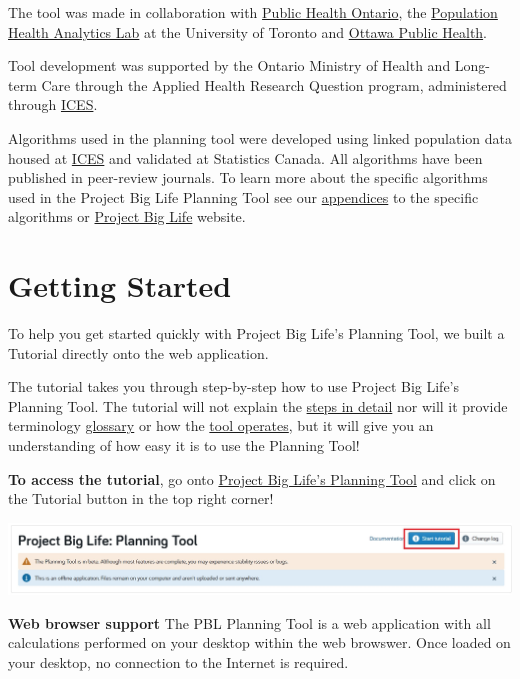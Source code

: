 \documentclass[]{book}
\begin{document}
The tool was made in collaboration with
\href{https://www.publichealthontario.ca/}{Public Health Ontario}, the
\href{https://pophealthanalytics.com/}{Population Health Analytics Lab}
at the University of Toronto and
\href{http://www.ottawapublichealth.ca/en/index.aspx}{Ottawa Public
Health}.

Tool development was supported by the Ontario Ministry of Health and
Long-term Care through the Applied Health Research Question program,
administered through \href{https://www.ICES.on.ca}{ICES}.

Algorithms used in the planning tool were developed using linked
population data housed at \href{https://www.ices.on.ca/}{ICES} and
validated at Statistics Canada. All algorithms have been published in
peer-review journals. To learn more about the specific algorithms used
in the Project Big Life Planning Tool see our
\protect\hyperlink{mport}{appendices} to the specific algorithms or
\href{https://www.projectbiglife.ca/science}{Project Big Life} website.

\chapter{Getting Started}\label{getting-started}

To help you get started quickly with Project Big Life's Planning Tool,
we built a Tutorial directly onto the web application.

The tutorial takes you through step-by-step how to use Project Big
Life's Planning Tool. The tutorial will not explain the
\protect\hyperlink{howto}{steps in detail} nor will it provide
terminology \protect\hyperlink{glossary}{glossary} or how the
\protect\hyperlink{mport}{tool operates}, but it will give you an
understanding of how easy it is to use the Planning Tool!

\textbf{To access the tutorial}, go onto
\href{http://planning.projectbiglife.ca/}{Project Big Life's Planning
Tool} and click on the Tutorial button in the top right corner!

\begin{center}\includegraphics{Images/Tutorial Button} \end{center}

\textbf{Web browser support} The PBL Planning Tool is a web application
with all calculations performed on your desktop within the web browswer.
Once loaded on your desktop, no connection to the Internet is required.
\end{document}

